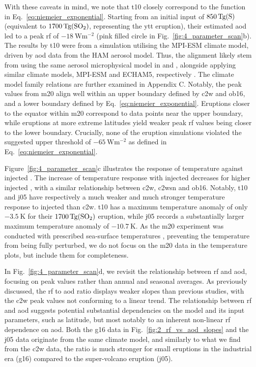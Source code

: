 \documentclass{ametsocV6.1}
\newcommand{\iso}[1][i]{{#1}njected \ce{SO2}}
\begin{document}
With these caveats in mind, we note that \gls{t10} closely correspond to the function in
Eq.~\ref{eq:niemeier_exponential}. Starting from an initial input of
\(\SI{850}{\tera\gram(\ce{S})}\) (equivalent to \(\SI{1700}{\tera\gram(\ce{SO2})}\),
representing the \gls{ytt} eruption), their estimated \gls{aod} led to a peak \gls{rf}
of \(\SI{-18}{\watt\metre^{-2}}\) (pink filled circle in
Fig.~\ref{fig:4_parameter_scan}b). The results by \gls{t10} were from a simulation
utilising the MPI-ESM climate model, driven by \gls{aod} data from the HAM aerosol
model. Thus, the alignment likely stem from using the same aerosol microphysical model
in \citet{timmreck2010} and \citet{niemeier2015}, alongside applying similar climate
models, MPI-ESM and ECHAM5, respectively \citep{kuma2023}. The climate model family
relations are further examined in Appendix C. Notably, the peak values from \gls{m20}
align well within an upper boundary defined by \gls{c2w} and \gls{ob16}, and a lower
boundary defined by Eq.~\ref{eq:niemeier_exponential}. Eruptions closer to the equator
within \gls{m20} correspond to data points near the upper boundary, while eruptions at
more extreme latitudes yield weaker peak \gls{rf} values being closer to the lower
boundary. Crucially, none of the eruption simulations violated the suggested upper
threshold of \(\SI{-65}{\watt\metre^{-2}}\) as defined in
Eq.~\ref{eq:niemeier_exponential}.

Figure~\ref{fig:4_parameter_scan}c illustrates the response of temperature against
\iso{}. The increase of temperature response with \iso{} decreases for higher \iso{},
with a similar relationship between \gls{c2w}, \gls{c2wsn} and \gls{ob16}. Notably,
\gls{t10} and \gls{j05} have respectively a much weaker and much stronger temperature
response to \iso{} than \gls{c2w}. \gls{t10} has a maximum temperature anomaly of only
\(\SI{-3.5}{\kelvin}\) for their \(\SI{1700}{\tera\gram(\ce{SO2})}\) eruption, while
\gls{j05} records a substantially larger maximum temperature anomaly of
\(\SI{-10.7}{\kelvin}\). As the \gls{m20} experiment was conducted with prescribed
sea-surface temperatures \citep{marshall2020}, preventing the temperature from being
fully perturbed, we do not focus on the \gls{m20} data in the temperature plots, but
include them for completeness.

In Fig.~\ref{fig:4_parameter_scan}d, we revisit the relationship between \gls{rf} and
\gls{aod}, focusing on peak values rather than annual and seasonal averages. As
previously discussed, the \gls{rf} to \gls{aod} ratio displays weaker slopes than
previous studies, with the \gls{c2w} peak values not conforming to a linear trend. The
relationship between \gls{rf} and \gls{aod} suggests potential substantial dependencies
on the model and its input parameters, such as latitude, but most notably to an inherent
non-linear \gls{rf} dependence on \gls{aod}. Both the \gls{g16} data in
Fig.~\ref{fig:2_rf_vs_aod_slopes} and the \gls{j05} data originate from the same climate
model, and similarly to what we find from the \gls{c2w} data, the ratio is much stronger
for small eruptions in the industrial era (\gls{g16}) compared to the super-volcano
eruption (\gls{j05}).
\end{document}
